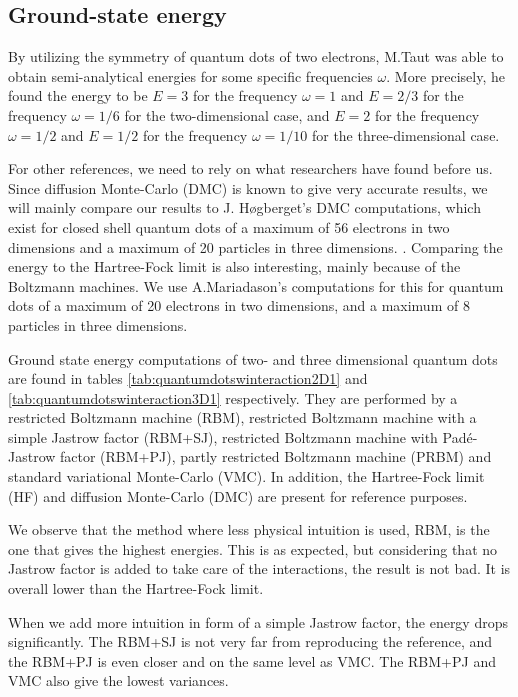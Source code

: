 \subsection{Ground-state energy}
By utilizing the symmetry of quantum dots of two electrons, M.Taut was able to obtain semi-analytical energies for some specific frequencies $\omega$. More precisely, he found the energy to be $E=3$ for the frequency $\omega=1$ and $E=2/3$ for the frequency $\omega=1/6$ for the two-dimensional case, and $E=2$ for the frequency $\omega=1/2$ and $E=1/2$ for the frequency $\omega=1/10$ for the three-dimensional case. \cite{taut_two_1993}\cite{taut_two_1994}

For other references, we need to rely on what researchers have found before us. Since diffusion Monte-Carlo (DMC) is known to give very accurate results, we will mainly compare our results to J. Høgberget's DMC computations, which exist for closed shell quantum dots of a maximum of 56 electrons in two dimensions and a maximum of 20 particles in three dimensions. \cite{hogberget_quantum_2013}. Comparing the energy to the Hartree-Fock limit is also interesting, mainly because of the Boltzmann machines. We use A.Mariadason's computations for this for quantum dots of a maximum of 20 electrons in two dimensions, and a maximum of 8 particles in three dimensions. \cite{mariadason_quantum_2018}

Ground state energy computations of two- and three dimensional quantum dots are found in tables \eqref{tab:quantumdotswinteraction2D1} and \eqref{tab:quantumdotswinteraction3D1} respectively. They are performed by a restricted Boltzmann machine (RBM), restricted Boltzmann machine with a simple Jastrow factor (RBM+SJ), restricted Boltzmann machine with Padé-Jastrow factor (RBM+PJ), partly restricted Boltzmann machine (PRBM) and standard variational Monte-Carlo (VMC). In addition, the Hartree-Fock limit (HF) and diffusion Monte-Carlo (DMC) are present for reference purposes. 

We observe that the method where less physical intuition is used, RBM, is the one that gives the highest energies. This is as expected, but considering that no Jastrow factor is added to take care of the interactions, the result is not bad. It is overall lower than the Hartree-Fock limit. 

When we add more intuition in form of a simple Jastrow factor, the energy drops significantly. The RBM+SJ is not very far from reproducing the reference, and the RBM+PJ is even closer and on the same level as VMC. The RBM+PJ and VMC also give the lowest variances.

